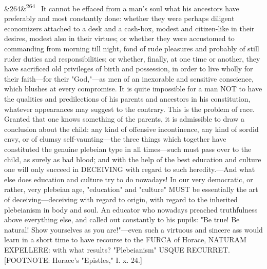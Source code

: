 \documentclass[12pt]{article}
\newcommand{\para}[1][]{\par\noindent\ifx&#1&\else\textsuperscript{\footnotesize #1}~\fi}
\begin{document}
\para[264] It cannot be effaced from a man's soul what his ancestors have preferably and most constantly done: whether they were perhaps diligent economizers attached to a desk and a cash-box, modest and citizen-like in their desires, modest also in their virtues; or whether they were accustomed to commanding from morning till night, fond of rude pleasures and probably of still ruder duties and responsibilities; or whether, finally, at one time or another, they have sacrificed old privileges of birth and possession, in order to live wholly for their faith---for their "God,"---as men of an inexorable and sensitive conscience, which blushes at every compromise. It is quite impossible for a man NOT to have the qualities and predilections of his parents and ancestors in his constitution, whatever appearances may suggest to the contrary. This is the problem of race. Granted that one knows something of the parents, it is admissible to draw a conclusion about the child: any kind of offensive incontinence, any kind of sordid envy, or of clumsy self-vaunting---the three things which together have constituted the genuine plebeian type in all times---such must pass over to the child, as surely as bad blood; and with the help of the best education and culture one will only succeed in DECEIVING with regard to such heredity.---And what else does education and culture try to do nowadays! In our very democratic, or rather, very plebeian age, "education" and "culture" MUST be essentially the art of deceiving---deceiving with regard to origin, with regard to the inherited plebeianism in body and soul. An educator who nowadays preached truthfulness above everything else, and called out constantly to his pupils: "Be true! Be natural! Show yourselves as you are!"---even such a virtuous and sincere ass would learn in a short time to have recourse to the FURCA of Horace, NATURAM EXPELLERE: with what results? "Plebeianism" USQUE RECURRET. [FOOTNOTE: Horace's "Epistles," I. x. 24.]
\end{document}
